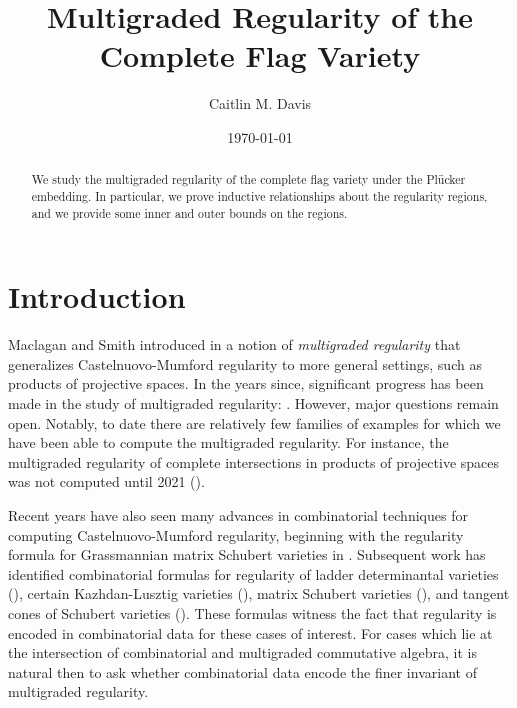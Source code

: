 \documentclass[12pt,reqno]{amsart}
\title{Multigraded Regularity of the Complete Flag Variety}
\author{Caitlin M. Davis}
\date{\today}
\theoremstyle{definition}
\theoremstyle{remark}
\begin{document}
\begin{abstract}
We study the multigraded regularity of the complete flag variety under the Pl\"ucker embedding.  In particular, we prove inductive relationships about the regularity regions, and we provide some inner and outer bounds on the regions.
\end{abstract}

\maketitle

\section{Introduction}

Maclagan and Smith introduced in \cite{MaclaganSmith2004} a notion of \textit{multigraded regularity} that generalizes Castelnuovo-Mumford regularity to more general settings, such as products of projective spaces.  In the years since, significant progress has been made in the study of multigraded regularity: \cite{MaclaganSmith2005,SidmanVanTuylWang2006,BerkeschErmanSmith2020,BotbolChardin2017,ChardinNemati2020,BruceCrantonHellerSayrafi2021,BruceCrantonHellerSayrafi2022,CrantonHellerNemati2022,BenderBuseChecaTsigaridas2024}. 
However, major questions remain open.  Notably, to date there are relatively few families of examples for which we have been able to compute the multigraded regularity.  For instance, the multigraded regularity of complete intersections in products of projective spaces was not computed until 2021 (\cite{BruceCrantonHellerSayrafi2021}).

Recent years have also seen many advances in combinatorial techniques for computing Castelnuovo-Mumford regularity, beginning with the regularity formula for Grassmannian matrix Schubert varieties in \cite{RajchgotRenRobichauxStDizierWeigandt2021}.  Subsequent work has identified combinatorial formulas for regularity of ladder determinantal varieties (\cite{RajchgotRobichauxWeigandt2023}), certain Kazhdan-Lusztig varieties (\cite{Robichaux2023}), matrix Schubert varieties (\cite{PechenikSpeyerWeigandt2024}), and tangent cones of Schubert varieties (\cite{Yong2024}).
These formulas witness the fact that regularity is encoded in combinatorial data for these cases of interest.  For cases which lie at the intersection of combinatorial and multigraded commutative algebra, it is natural then to ask whether combinatorial data encode the finer invariant of multigraded regularity.
\end{document}
